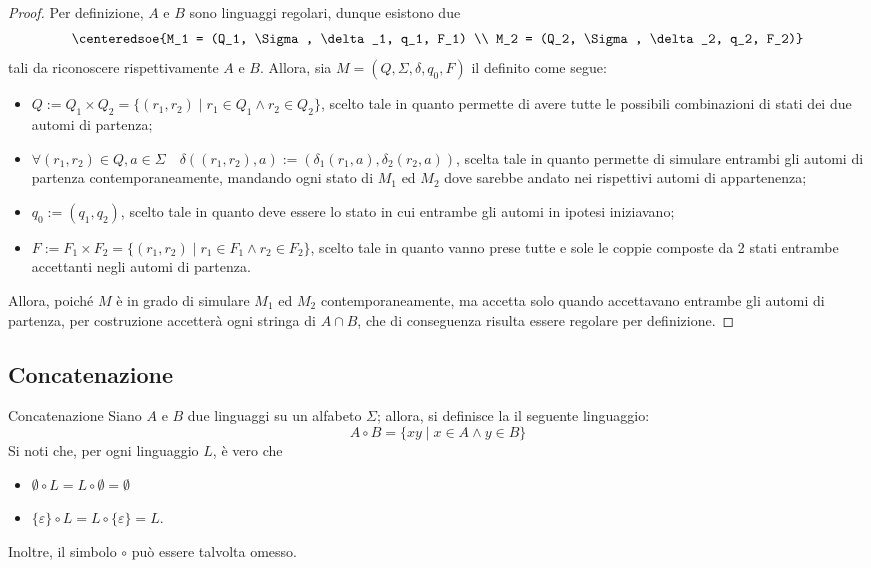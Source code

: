 \documentclass[a4paper, 12pt]{report}
\begin{document}
    \begin{proof}
        Per definizione, $A$ e $B$ sono linguaggi regolari, dunque esistono due \DFA $$\centeredsoe{M_1 = (Q_1, \Sigma, \delta_1, q_1, F_1) \\ M_2 = (Q_2, \Sigma, \delta_2, q_2, F_2)}$$ tali da riconoscere rispettivamente $A$ e $B$. Allora, sia $M = (Q, \Sigma, \delta, q_0, F)$ il \DFA definito come segue:

        \begin{itemize}
            \item $Q := Q_1 \times Q_2 = \{(r_1, r_2) \mid r_1 \in Q_1 \land r_2 \in Q_2\}$, scelto tale in quanto permette di avere tutte le possibili combinazioni di stati dei due automi di partenza;
            \item $\forall (r_1, r_2) \in Q, a \in \Sigma \quad \delta((r_1, r_2), a) := (\delta_1(r_1, a), \delta_2(r_2, a))$, scelta tale in quanto permette di simulare entrambi gli automi di partenza contemporaneamente, mandando ogni stato di $M_1$ ed $M_2$ dove sarebbe andato nei rispettivi automi di appartenenza;
            \item $q_0 := (q_1, q_2)$, scelto tale in quanto deve essere lo stato in cui entrambe gli automi in ipotesi iniziavano;
            \item $F:= F_1 \times F_2 = \{(r_1, r_2) \mid r_1 \in F_1 \land r_2 \in F_2\}$, scelto tale in quanto vanno prese tutte e sole le coppie composte da 2 stati entrambe accettanti negli automi di partenza.
        \end{itemize}

        Allora, poiché $M$ è in grado di simulare $M_1$ ed $M_2$ contemporaneamente, ma accetta solo quando accettavano entrambe gli automi di partenza, per costruzione accetterà ogni stringa di $A \cap B$, che di conseguenza risulta essere regolare per definizione.
    \end{proof}

    \subsection{Concatenazione}

    \begin{frameddefn}{Concatenazione}
        Siano $A$ e $B$ due linguaggi su un alfabeto $\Sigma$; allora, si definisce la  il seguente linguaggio: $$A \circ B = \{xy \mid x \in A \land y \in B\}$$ Si noti che, per ogni linguaggio $L$, è vero che 

        \begin{itemize}
            \item $\emptyset \circ L = L \circ \emptyset = \emptyset$
            \item $\{\varepsilon \} \circ L = L \circ \{ \varepsilon \} = L$.
        \end{itemize}

        Inoltre, il simbolo $\circ$ può essere talvolta omesso.
    \end{frameddefn}
\end{document}
